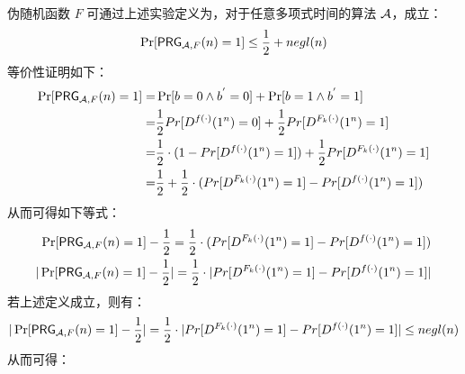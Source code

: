 \begin{questions}
        \begin{solution}
            \newline
            伪随机函数 $F$ 可通过上述实验定义为，对于任意多项式时间的算法 $\mathcal{A}$，成立：
            \begin{equation}
                \begin{aligned}
                    \Pr[\mathsf{PRG}_{\mathcal{A},F}(n)=1]\leq\frac{1}{2}+negl(n)
                \end{aligned}
            \end{equation}
            等价性证明如下：
            \begin{equation}
                \begin{aligned}
                    \Pr[\mathsf{PRG}_{\mathcal{A},F}(n)=1]=&\Pr[b=0\wedge{b}^{'}=0]+\Pr[b=1\wedge{b}^{'}=1]\\
                    =&\frac{1}{2}Pr[D^{f(\cdot)}(1^n)=0]+\frac{1}{2}Pr[D^{F_k(\cdot)}(1^n)=1]\\
                    =&\frac{1}{2}\cdot(1-Pr[D^{f(\cdot)}(1^n)=1])+\frac{1}{2}Pr[D^{F_k(\cdot)}(1^n)=1]\\
                    =&\frac{1}{2}+\frac{1}{2}\cdot(Pr[D^{F_k(\cdot)}(1^n)=1]-Pr[D^{f(\cdot)}(1^n)=1])
                \end{aligned}
            \end{equation}
            从而可得如下等式：
            \begin{equation}
                \begin{aligned}
                    \Pr[\mathsf{PRG}_{\mathcal{A},F}(n)=1]-\frac{1}{2}=\frac{1}{2}\cdot(Pr[D^{F_k(\cdot)}(1^n)=1]-Pr[D^{f(\cdot)}(1^n)=1])\\
                    |\Pr[\mathsf{PRG}_{\mathcal{A},F}(n)=1]-\frac{1}{2}|=\frac{1}{2}\cdot|Pr[D^{F_k(\cdot)}(1^n)=1]-Pr[D^{f(\cdot)}(1^n)=1]|
                \end{aligned}
            \end{equation}
            若上述定义成立，则有：
            \begin{equation}
                \begin{aligned}
                    |\Pr[\mathsf{PRG}_{\mathcal{A},F}(n)=1]-\frac{1}{2}|=\frac{1}{2}\cdot|Pr[D^{F_k(\cdot)}(1^n)=1]-Pr[D^{f(\cdot)}(1^n)=1]|\leq{negl}(n)
                \end{aligned}
            \end{equation}
            从而可得：
            \begin{equation}
                \begin{aligned}

\end{aligned}
\end{equation}
\end{solution}
\end{questions}
